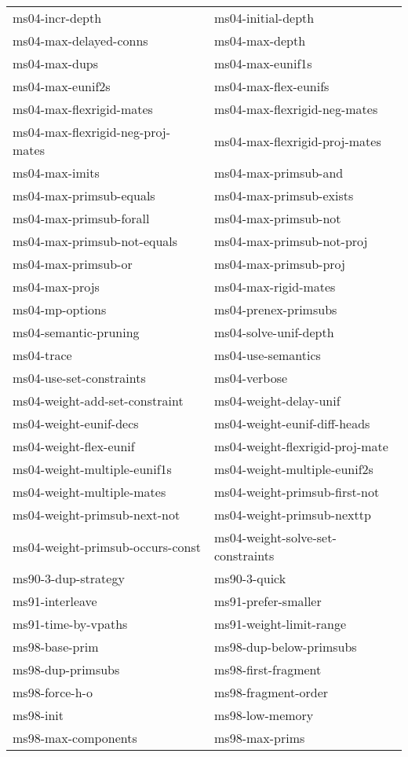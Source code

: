 \begin{description}
\begin{tabular}{l l}
ms04-incr-depth&ms04-initial-depth\\
ms04-max-delayed-conns&ms04-max-depth\\
ms04-max-dups&ms04-max-eunif1s\\
ms04-max-eunif2s&ms04-max-flex-eunifs\\
ms04-max-flexrigid-mates&ms04-max-flexrigid-neg-mates\\
ms04-max-flexrigid-neg-proj-mates&ms04-max-flexrigid-proj-mates\\
ms04-max-imits&ms04-max-primsub-and\\
ms04-max-primsub-equals&ms04-max-primsub-exists\\
ms04-max-primsub-forall&ms04-max-primsub-not\\
ms04-max-primsub-not-equals&ms04-max-primsub-not-proj\\
ms04-max-primsub-or&ms04-max-primsub-proj\\
ms04-max-projs&ms04-max-rigid-mates\\
ms04-mp-options&ms04-prenex-primsubs\\
ms04-semantic-pruning&ms04-solve-unif-depth\\
ms04-trace&ms04-use-semantics\\
ms04-use-set-constraints&ms04-verbose\\
ms04-weight-add-set-constraint&ms04-weight-delay-unif\\
ms04-weight-eunif-decs&ms04-weight-eunif-diff-heads\\
ms04-weight-flex-eunif&ms04-weight-flexrigid-proj-mate\\
ms04-weight-multiple-eunif1s&ms04-weight-multiple-eunif2s\\
ms04-weight-multiple-mates&ms04-weight-primsub-first-not\\
ms04-weight-primsub-next-not&ms04-weight-primsub-nexttp\\
ms04-weight-primsub-occurs-const&ms04-weight-solve-set-constraints\\
ms90-3-dup-strategy&ms90-3-quick\\
ms91-interleave&ms91-prefer-smaller\\
ms91-time-by-vpaths&ms91-weight-limit-range\\
ms98-base-prim&ms98-dup-below-primsubs\\
ms98-dup-primsubs&ms98-first-fragment\\
ms98-force-h-o&ms98-fragment-order\\
ms98-init&ms98-low-memory\\
ms98-max-components&ms98-max-prims\\

\end{tabular}
\end{description}

